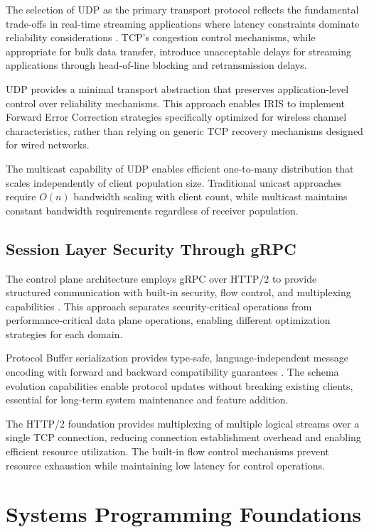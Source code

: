 The selection of UDP as the primary transport protocol reflects the fundamental trade-offs in real-time streaming applications where latency constraints dominate reliability considerations \cite{ahlswede2000network}. TCP's congestion control mechanisms, while appropriate for bulk data transfer, introduce unacceptable delays for streaming applications through head-of-line blocking and retransmission delays.

UDP provides a minimal transport abstraction that preserves application-level control over reliability mechanisms. This approach enables IRIS to implement Forward Error Correction strategies specifically optimized for wireless channel characteristics, rather than relying on generic TCP recovery mechanisms designed for wired networks.

The multicast capability of UDP enables efficient one-to-many distribution that scales independently of client population size. Traditional unicast approaches require $O(n)$ bandwidth scaling with client count, while multicast maintains constant bandwidth requirements regardless of receiver population.

\subsection{Session Layer Security Through gRPC}

The control plane architecture employs gRPC over HTTP/2 to provide structured communication with built-in security, flow control, and multiplexing capabilities \cite{google2015grpc}. This approach separates security-critical operations from performance-critical data plane operations, enabling different optimization strategies for each domain.

Protocol Buffer serialization provides type-safe, language-independent message encoding with forward and backward compatibility guarantees \cite{google2008protobuf}. The schema evolution capabilities enable protocol updates without breaking existing clients, essential for long-term system maintenance and feature addition.

The HTTP/2 foundation provides multiplexing of multiple logical streams over a single TCP connection, reducing connection establishment overhead and enabling efficient resource utilization. The built-in flow control mechanisms prevent resource exhaustion while maintaining low latency for control operations.

\section{Systems Programming Foundations}

